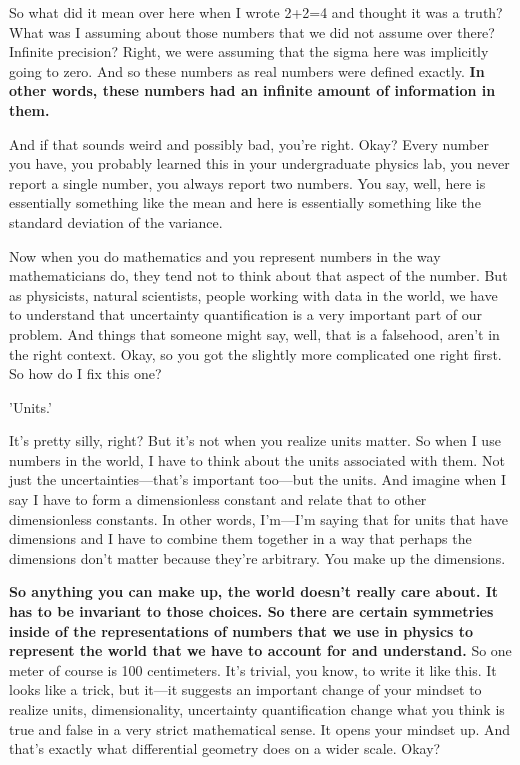 So what did it mean over here when I wrote 2+2=4 and thought it was a truth? What was I assuming about those numbers that we did not assume over there? Infinite precision? Right, we were assuming that the sigma here was implicitly going to zero. And so these numbers as real numbers were defined exactly. \textbf{In other words, these numbers had an infinite amount of information in them.} 

And if that sounds weird and possibly bad, you're right. Okay? Every number you have, you probably learned this in your undergraduate physics lab, you never report a single number, you always report two numbers. You say, well, here is essentially something like the mean and here is essentially something like the standard deviation of the variance. 

Now when you do mathematics and you represent numbers in the way mathematicians do, they tend not to think about that aspect of the number. But as physicists, natural scientists, people working with data in the world, we have to understand that uncertainty quantification is a very important part of our problem. And things that someone might say, well, that is a falsehood, aren't in the right context. Okay, so you got the slightly more complicated one right first. So how do I fix this one?

'Units.'

It's pretty silly, right? But it's not when you realize units matter. So when I use numbers in the world, I have to think about the units associated with them. Not just the uncertainties—that's important too—but the units. And imagine when I say I have to form a dimensionless constant and relate that to other dimensionless constants. In other words, I'm—I'm saying that for units that have dimensions and I have to combine them together in a way that perhaps the dimensions don't matter because they're arbitrary. You make up the dimensions. 

\textbf{So anything you can make up, the world doesn't really care about. It has to be invariant to those choices. So there are certain symmetries inside of the representations of numbers that we use in physics to represent the world that we have to account for and understand.} So one meter of course is 100 centimeters. It's trivial, you know, to write it like this. It looks like a trick, but it—it suggests an important change of your mindset to realize units, dimensionality, uncertainty quantification change what you think is true and false in a very strict mathematical sense. It opens your mindset up. And that's exactly what differential geometry does on a wider scale. Okay? 



